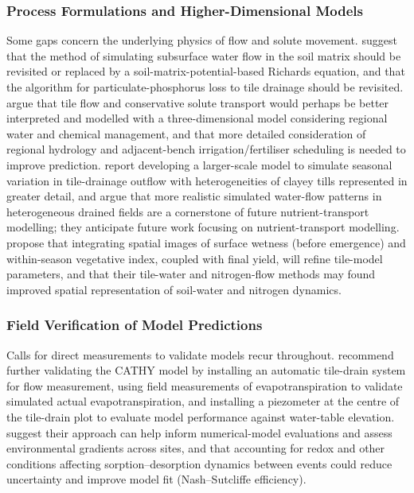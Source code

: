 \documentclass[11pt]{article}
\begin{document}
\subsubsection{Process Formulations and Higher-Dimensional Models}

Some gaps concern the underlying physics of flow and solute movement. \textcite{Qi2018} suggest that the method of simulating subsurface water flow in the soil matrix should be revisited or replaced by a soil-matrix-potential-based Richards equation, and that the algorithm for particulate-phosphorus loss to tile drainage should be revisited. \textcite{Mohanty1998} argue that tile flow and conservative solute transport would perhaps be better interpreted and modelled with a three-dimensional model considering regional water and chemical management, and that more detailed consideration of regional hydrology and adjacent-bench irrigation/fertiliser scheduling is needed to improve prediction. \textcite{DeSchepper2015} report developing a larger-scale model to simulate seasonal variation in tile-drainage outflow with heterogeneities of clayey tills represented in greater detail, and argue that more realistic simulated water-flow patterns in heterogeneous drained fields are a cornerstone of future nutrient-transport modelling; they anticipate future work focusing on nutrient-transport modelling. \textcite{Garrison1999} propose that integrating spatial images of surface wetness (before emergence) and within-season vegetative index, coupled with final yield, will refine tile-model parameters, and that their tile-water and nitrogen-flow methods may found improved spatial representation of soil-water and nitrogen dynamics.

\subsubsection{Field Verification of Model Predictions}

Calls for direct measurements to validate models recur throughout. \textcite{Muma2017} recommend further validating the CATHY model by installing an automatic tile-drain system for flow measurement, using field measurements of evapotranspiration to validate simulated actual evapotranspiration, and installing a piezometer at the centre of the tile-drain plot to evaluate model performance against water-table elevation. \textcite{Nazari2021} suggest their approach can help inform numerical-model evaluations and assess environmental gradients across sites, and that accounting for redox and other conditions affecting sorption--desorption dynamics between events could reduce uncertainty and improve model fit (Nash--Sutcliffe efficiency).
\end{document}

